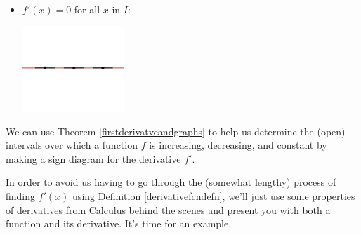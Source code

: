 \begin{itemize}
\begin{center}
\begin{multicols}{2}
\end{multicols}

\end{center}


\item $f'(x) = 0$  for all $x$ in $I$:

\begin{center}

\includegraphics[width=1.5in]{./AppDerivativesGraphics/Constant.png} 

\end{center}

\end{itemize}

We can use Theorem \ref{firstderivatveandgraphs} to help us determine the (open) intervals over which a function $f$ is increasing, decreasing, and constant by making a sign diagram for the derivative $f'$. 

\medskip

In order to avoid us having to go through the (somewhat lengthy) process of finding $f'(x)$ using Definition \ref{derivativefcndefn}, we'll just use some properties of derivatives from Calculus behind the scenes and present you with both a function and its derivative.  It's time for an example.

\medskip

